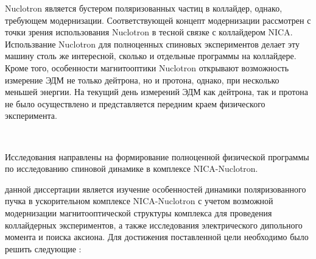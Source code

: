 \par Nuclotron является бустером поляризованных частиц в коллайдер, однако, требующем модернизации. Соответствующей концепт модернизации рассмотрен с точки зрения использования Nuclotron в тесной связке с коллайдером NICA.
Использвание Nuclotron для полноценных спиновых экспериментов делает эту машину столь же интересной, сколько и отдельные программы на коллайдере. 
Кроме того, особенности магнитооптики Nuclotron открывают возможность измерение ЭДМ не только дейтрона, но и протона, однако, при несколько меньшей энергии. На текущий день измерений ЭДМ как дейтрона, так и протона не было осуществлено и представляется передним краем физического эксперимента.  

~\\
\par {\actuality} Исследования направлены на формирование полноценной физической программы по исследованию спиновой динамике в комплексе NICA-Nuclotron.
~\\
\par {\aim} данной диссертации является изучение 
особенностей динамики поляризованного пучка в ускорительном 
комплексе NICA-Nuclotron с учетом возможной модернизации 
магнитооптической структуры комплекса для проведения коллайдерных экспериментов, а также исследования 
электрического дипольного момента и поиска аксиона.
Для достижения поставленной цели необходимо было 
решить следующие {\tasks}:


